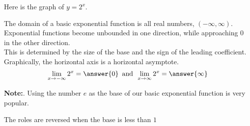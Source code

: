 \documentclass{ximera}
\begin{document}
\begin{example}

Here is the graph of $y = 2^x$.

\begin{image}
\end{image}


The domain of a basic exponential function is all real numbers, $(-\infty, \infty)$.  Exponential functions become unbounded in one direction, while approaching $0$ in the other direction. \\

This is determined by the size of the base and the sign of the leading coefficient. \\

Graphically, the horizontal axis is a horizontal asymptote.\\



\[  \lim_{x \to -\infty} 2^x = \answer{0}     \, \text{ and } \,  \lim_{x \to \infty} 2^x = \answer{\infty}   \]


\textbf{Note:}. Using the number $e$ as the base of our basic exponential function is very popular.

\end{example}





The roles are reversed when the base is less than $1$ \\
\end{document}

